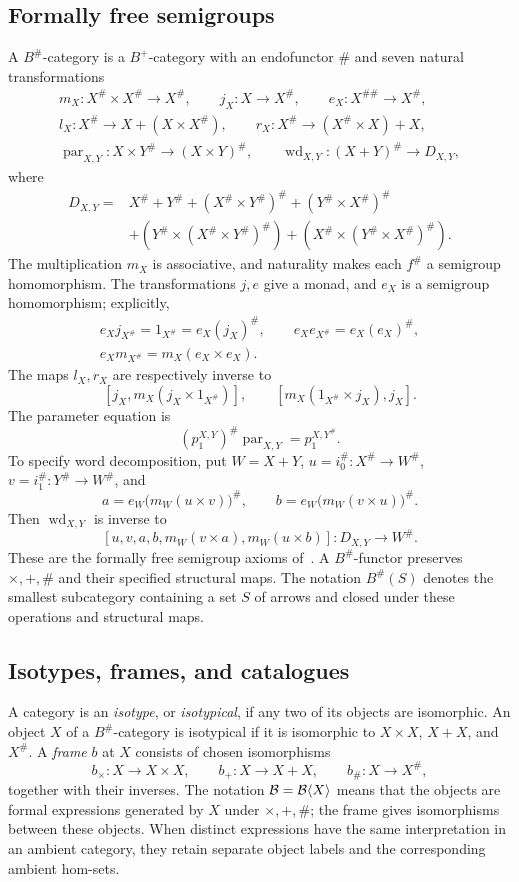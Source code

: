 \documentclass[11pt]{article}
\begin{document}
\subsection{Formally free semigroups}\label{sec:formal-semigroups}
A $B^\#$-category is a $B^+$-category with an endofunctor $\#$
and seven natural transformations
\begin{gather*}
 m_X:X^\#\times X^\#\to X^\#,
 \qquad j_X:X\to X^\#,
 \qquad e_X:X^{\#\#}\to X^\#,\\
 l_X:X^\#\to X+(X\times X^\#),
 \qquad r_X:X^\#\to(X^\#\times X)+X,\\
 \operatorname{par}_{X,Y}:X\times Y^\#\to(X\times Y)^\#,
 \qquad
 \operatorname{wd}_{X,Y}:(X+Y)^\#\to D_{X,Y},
\end{gather*}
where
\begin{align*}
 D_{X,Y}={}&X^\#+Y^\#+(X^\#\times Y^\#)^\#
 +(Y^\#\times X^\#)^\#\\
 &+(Y^\#\times(X^\#\times Y^\#)^\#)
 +(X^\#\times(Y^\#\times X^\#)^\#).
\end{align*}
The multiplication $m_X$ is associative, and naturality makes
each $f^\#$ a semigroup homomorphism. The transformations $j,e$
give a monad, and $e_X$ is a semigroup homomorphism; explicitly,
\begin{gather*}
 e_Xj_{X^\#}=1_{X^\#}=e_X(j_X)^\#,
 \qquad e_Xe_{X^\#}=e_X(e_X)^\#,\\
 e_Xm_{X^\#}=m_X(e_X\times e_X).
\end{gather*}
The maps $l_X,r_X$ are respectively inverse to
\[
 [j_X,m_X(j_X\times1_{X^\#})],
 \qquad [m_X(1_{X^\#}\times j_X),j_X].
\]
The parameter equation is
\[
 (p_1^{X,Y})^\#\operatorname{par}_{X,Y}=p_1^{X,Y^\#}.
\]
To specify word decomposition, put $W=X+Y$,
$u=i_0^\#:X^\#\to W^\#$, $v=i_1^\#:Y^\#\to W^\#$, and
\[
 a=e_W\bigl(m_W(u\times v)\bigr)^\#,
 \qquad b=e_W\bigl(m_W(v\times u)\bigr)^\#.
\]
Then $\operatorname{wd}_{X,Y}$ is inverse to
\[
 [u,v,a,b,m_W(v\times a),m_W(u\times b)]:D_{X,Y}\to W^\#.
\]
These are the formally free semigroup axioms of~\cite{H}.
A $B^\#$-functor preserves $\times,+,\#$ and their specified
structural maps. The notation $B^\#(S)$ denotes the smallest
subcategory containing a set $S$ of arrows and closed under these
operations and structural maps.

\subsection{Isotypes, frames, and catalogues}
A category is an \emph{isotype}, or \emph{isotypical}, if any two
of its objects are isomorphic. An object $X$ of a $B^\#$-category
is isotypical if it is isomorphic to $X\times X$, $X+X$, and
$X^\#$. A \emph{frame} $b$ at $X$ consists of chosen isomorphisms
\[
 b_\times:X\to X\times X,\qquad
 b_+:X\to X+X,\qquad b_\#:X\to X^\#,
\]
together with their inverses. The notation $\mathcal B=\mathcal B\langle X\rangle$
means that the objects are formal expressions generated by $X$
under $\times,+,\#$; the frame gives isomorphisms between these
objects. When distinct expressions have the same interpretation in
an ambient category, they retain separate object labels and the
corresponding ambient hom-sets.
\end{document}
